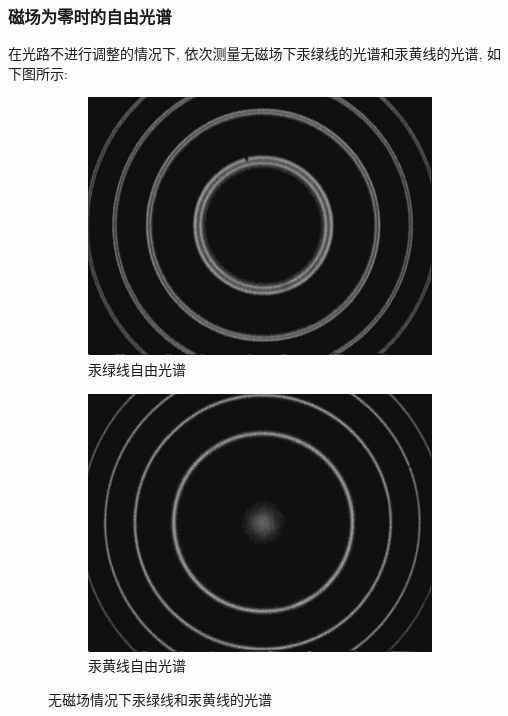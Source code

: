 \documentclass[12pt,a4paper]{article}
\begin{document}
\subsubsection{磁场为零时的自由光谱}
在光路不进行调整的情况下, 依次测量无磁场下汞绿线的光谱和汞黄线的光谱, 如下图所示: 
\begin{figure}[H]
    \centering
    \begin{subfigure}[b]{0.45\textwidth}
      \centering
      \includegraphics[width=\textwidth]{Doublerings.jpg}
      \caption{汞绿线自由光谱}
    \end{subfigure}
    \hfill
    \begin{subfigure}[b]{0.45\textwidth}
      \centering
      \includegraphics[width=\textwidth]{SingleringCompare.jpg}
      \caption{汞黄线自由光谱}
    \end{subfigure}
  \caption{无磁场情况下汞绿线和汞黄线的光谱}
  \end{figure}
\end{document}
